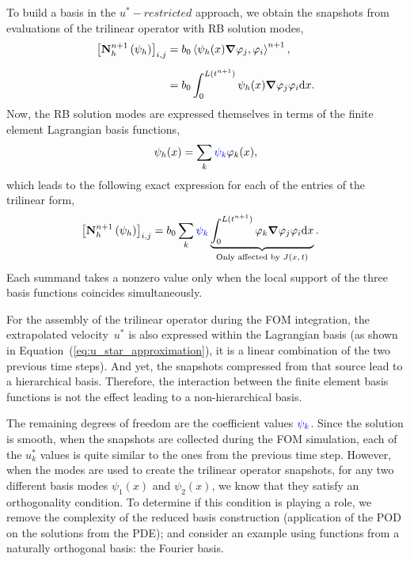 \documentclass[../../thesis.tex]{subfiles}
\newcommand{\inner}[2]{\left<#1, #2\right>}
\newcommand{\Ah}[1]{\ensuremath{\vb{#1}^{n+1}_h}}
\begin{document}
To build a basis in the $u^{*}-restricted$ approach, 
we obtain the snapshots from evaluations of the trilinear operator with RB solution modes,
\begin{equation}
    \begin{split}
        \qty[\Ah{N}\left(\psi_{h}\right)]_{i,j}
        &= b_0 \inner{\psi_h(x)\grad \varphi_j}{\varphi_i}^{n+1},
        \\[2mm]
        &= b_0 \int_{0}^{L(t^{n+1})} \psi_h(x) \grad \varphi_j \varphi_i \dd x.
    \end{split}
\end{equation}
Now, the RB solution modes are expressed themselves in terms of 
the finite element Lagrangian basis functions,
\begin{equation}
    \psi_h(x) = \sum_{k} 
    \textcolor{blue}{\psi_k} 
    \varphi_{k}(x),
\end{equation}
which leads to the following exact expression for each of the entries of the trilinear form,
\begin{equation}
    \begin{split}
        \qty[\Ah{N}\left(\psi_{h}\right)]_{i,j}
        &= b_0 \sum_k 
        \textcolor{blue}{\psi_k} 
        \underbrace{\int_{0}^{L(t^{n+1})} 
        \varphi_{k} \grad \varphi_j \varphi_i \dd x}_{\text{Only affected by $J(x, t)$}}.
    \end{split}
    \label{eq:appendix_exact_representation_triliear_form}
\end{equation}
Each summand takes a nonzero value only when the local support of the three
basis functions coincides simultaneously.

For the assembly of the trilinear operator during the FOM integration, 
the extrapolated velocity~$u^{*}$ is also expressed within the Lagrangian basis
(as shown in Equation~(\ref{eq:u_star_approximation}), 
it is a linear combination of the two previous time steps).
And yet, the snapshots compressed from that source lead to a hierarchical basis.
Therefore, the interaction between the finite element basis functions
is not the effect leading to a non-hierarchical basis.

The remaining degrees of freedom are the coefficient values 
$\textcolor{blue}{\psi_k}$.
Since the solution is smooth,
when the snapshots are collected during the FOM simulation, 
each of the $u_k^{*}$ values is quite similar to the ones from the previous time step.
However, when the modes are used to create 
the trilinear operator snapshots, 
for any two different basis modes $\psi_1(x)$ and $\psi_2(x)$,
we know that they satisfy an orthogonality condition.
To determine if this condition is playing a role, 
we remove the complexity of the reduced basis construction 
(application of the POD on the solutions from the PDE);
and consider an example using functions from a naturally orthogonal basis:
the Fourier basis.
\end{document}
